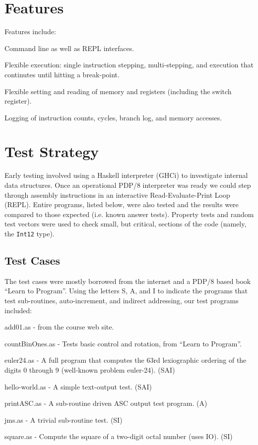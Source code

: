 \documentclass[11pt]{exam}
\def\Int{\texttt{Int12}}
\begin{document}
\section{Features}
Features include:
\begin{itemize*}
\item Command line as well as REPL interfaces.
\item Flexible execution: single instruction stepping, multi-stepping, and execution that continutes until hitting a break-point.
\item Flexible setting and reading of memory and registers (including the switch register).
\item Logging of instruction counts, cycles, branch log, and memory accesses.
\end{itemize*}

\section{Test Strategy}
Early testing involved using a Haskell interpreter (GHCi) to
investigate internal data structures.  Once an operational PDP/8
interpreter was ready we could step through assembly instructions in
an interactive Read-Evaluate-Print Loop (REPL).  Entire programs,
listed below, were also tested and the results were compared to those
expected (i.e. known answer tests).  Property tests and random test
vectors were used to check small, but critical, sections of the code
(namely, the \Int{} type).

\subsection{Test Cases}
The test cases were mostly borrowed from the internet and a PDP/8
based book ``Learn to Program''.  Using the letters S, A, and I to
indicate the programs that test sub-routines, auto-increment, and
indirect addressing, our test programs included:

{\small
\begin{itemize*}
\item add01.as - from the course web site.
\item countBinOnes.as - Tests basic control and rotation, from ``Learn to Program''.
\item euler24.as - A full program that computes the 63rd lexiographic ordering of
  the digits 0 through 9 (well-known problem euler-24). (SAI)
\item hello-world.as - A simple text-output test. (SAI)
\item printASC.as - A sub-routine driven ASC output test program.  (A)
\item jms.as - A trivial sub-routine test. (SI)
\item square.as - Compute the square of a two-digit octal number (uses IO).  (SI)
\end{itemize*}
}
\end{document}
